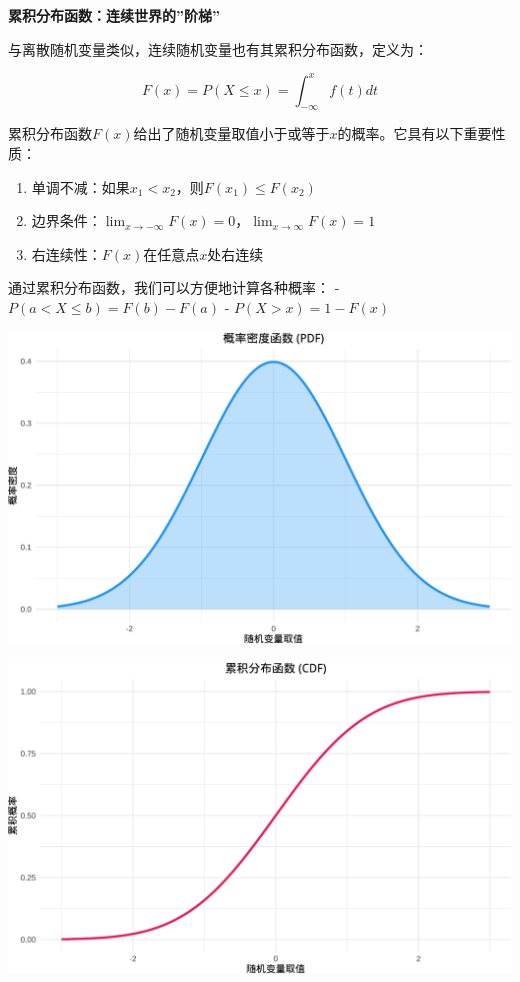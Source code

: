 \documentclass[
]{book}
\providecommand{\tightlist}{%
  \setlength{\itemsep}{0pt}\setlength{\parskip}{0pt}}
\begin{document}
\textbf{累积分布函数：连续世界的''阶梯''}

与离散随机变量类似，连续随机变量也有其累积分布函数，定义为：

\[F(x) = P(X \leq x) = \int_{-\infty}^x f(t) dt\]

累积分布函数\(F(x)\)给出了随机变量取值小于或等于\(x\)的概率。它具有以下重要性质：

\begin{enumerate}
\def\labelenumi{\arabic{enumi}.}
\tightlist
\item
  单调不减：如果\(x_1 < x_2\)，则\(F(x_1) \leq F(x_2)\)
\item
  边界条件：\(\lim_{x \to -\infty} F(x) = 0\)，\(\lim_{x \to \infty} F(x) = 1\)
\item
  右连续性：\(F(x)\)在任意点\(x\)处右连续
\end{enumerate}

通过累积分布函数，我们可以方便地计算各种概率：
- \(P(a < X \leq b) = F(b) - F(a)\)
- \(P(X > x) = 1 - F(x)\)

\begin{center}\includegraphics[width=0.8\linewidth]{ecological-statistics_files/figure-latex/unnamed-chunk-26-1} \end{center}

\begin{center}\includegraphics[width=0.8\linewidth]{ecological-statistics_files/figure-latex/unnamed-chunk-26-2} \end{center}
\end{document}
